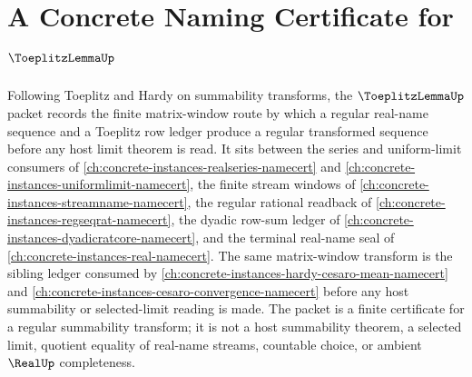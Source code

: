 \chapter{A Concrete Naming Certificate for $\ToeplitzLemmaUp$}
\label{ch:concrete-instances-toeplitz-lemma-namecert}

Following Toeplitz and Hardy on summability transforms, the $\ToeplitzLemmaUp$ packet records the finite matrix-window route by which a regular real-name sequence and a Toeplitz row ledger produce a regular transformed sequence before any host limit theorem is read. It sits between the series and uniform-limit consumers of \autoref{ch:concrete-instances-realseries-namecert} and \autoref{ch:concrete-instances-uniformlimit-namecert}, the finite stream windows of \autoref{ch:concrete-instances-streamname-namecert}, the regular rational readback of \autoref{ch:concrete-instances-regseqrat-namecert}, the dyadic row-sum ledger of \autoref{ch:concrete-instances-dyadicratcore-namecert}, and the terminal real-name seal of \autoref{ch:concrete-instances-real-namecert}. The same matrix-window transform is the sibling ledger consumed by \autoref{ch:concrete-instances-hardy-cesaro-mean-namecert} and \autoref{ch:concrete-instances-cesaro-convergence-namecert} before any host summability or selected-limit reading is made. The packet is a finite certificate for a regular summability transform; it is not a host summability theorem, a selected limit, quotient equality of real-name streams, countable choice, or ambient $\RealUp$ completeness.

